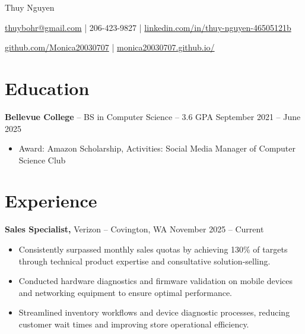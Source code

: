 \documentclass[11pt]{article}       %
\begin{document}
\centerline{\Huge Thuy Nguyen}

\vspace{5pt}

\centerline{\href{mailto:thuybohr@gmail.com}{thuybohr@gmail.com} | 206-423-9827 |
\href{https://www.linkedin.com/in/thuy-nguyen-46505121b/}{linkedin.com/in/thuy-nguyen-46505121b}}

\centerline{\href{https://github.com/Monica20030707}{github.com/Monica20030707} | 
\href{https://monica20030707.github.io/}{monica20030707.github.io/}} 

\vspace{-9pt}

\section*{Education}
\textbf{Bellevue College} -- BS in Computer Science -- 3.6 GPA \hfill September 2021 -- June 2025\\
\vspace{-9pt}
\begin{itemize}
  \item Award: Amazon Scholarship, Activities: Social Media Manager of Computer Science Club
\end{itemize}

\vspace{-18.5pt}

\section*{Experience}

\textbf{Sales Specialist,} {Verizon} -- Covington, WA \hfill November 2025 -- Current \\
\vspace{-9pt}
\begin{itemize}
  \item Consistently surpassed monthly sales quotas by achieving 130\% of targets through technical product expertise and consultative solution-selling.
  \item Conducted hardware diagnostics and firmware validation on mobile devices and networking equipment to ensure optimal performance.
  \item Streamlined inventory workflows and device diagnostic processes, reducing customer wait times and improving store operational efficiency.
\end{itemize}
\end{document}
